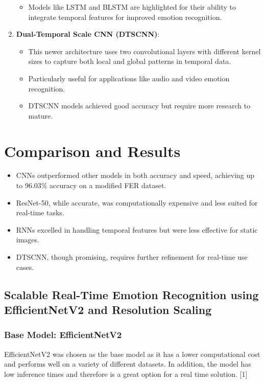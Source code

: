 \documentclass{article}
\begin{document}
\begin{enumerate}
\begin{itemize}
        \item Models like LSTM and BLSTM are highlighted for their ability to integrate temporal features for improved emotion recognition.
    \end{itemize}
    \item \textbf{Dual-Temporal Scale CNN (DTSCNN)}:
    \begin{itemize}
        \item This newer architecture uses two convolutional layers with different kernel sizes to capture both local and global patterns in temporal data.
        \item Particularly useful for applications like audio and video emotion recognition.
        \item DTSCNN models achieved good accuracy but require more research to mature.
    \end{itemize}
\end{enumerate}

\section*{Comparison and Results}

\begin{itemize}
    \item CNNs outperformed other models in both accuracy and speed, achieving up to 96.03\% accuracy on a modified FER dataset.
    \item ResNet-50, while accurate, was computationally expensive and less suited for real-time tasks.
    \item RNNs excelled in handling temporal features but were less effective for static images.
    \item DTSCNN, though promising, requires further refinement for real-time use cases.
\end{itemize}

\subsection*{Scalable Real-Time Emotion Recognition using EfficientNetV2 and Resolution Scaling}

\subsubsection*{Base Model: EfficientNetV2}
EfficientNetV2 was chosen as the base model as it has a lower computational cost and performs well on a variety of different datasets.
In addition, the model has low inference times and therefore is a great option for a real time solution. [1]
\end{document}
